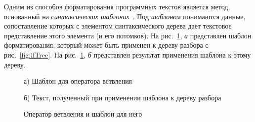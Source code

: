 Одним из способов форматирования программных текстов является метод, основанный на \emph{синтаксических шаблонах}~\cite{paper:while}. %
Под \emph{шаблоном} понимаются данные, сопоставление которых с элементом синтаксического дерева дает текстовое представление этого элемента (и его потомков). 
На рис.~\ref{fig:templatecodeintro}, \emph{а} представлен шаблон форматирования, который может быть применен к дереву разбора с рис.~\ref{fig:ifTree}.
На рис.~\ref{fig:templatecodeintro}, \emph{б} представлен результат применения шаблона к этому дереву.

%  
%  
\begin{figure}[ht]
  \noindent
  \begin{minipage}{.4\textwidth}
    
    \caption*{а) Шаблон для оператора ветвления}    
  \end{minipage}
  \hfill
  \begin{minipage}{.5\textwidth}
    
    \caption*{б) Текст, полученный при применении шаблона к дереву разбора}    
  \end{minipage}
  \caption{Оператор ветвления и шаблон для него}    
  \label{fig:templatecodeintro}
\end{figure}


